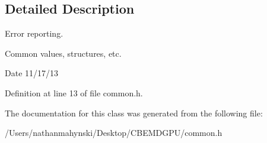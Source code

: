 \subsection{Detailed Description}
Error reporting. 

Common values, structures, etc. \begin{DoxyDate}{Date}
11/17/13 
\end{DoxyDate}


Definition at line 13 of file common.\-h.



The documentation for this class was generated from the following file\-:\begin{DoxyCompactItemize}
\item 
/\-Users/nathanmahynski/\-Desktop/\-C\-B\-E\-M\-D\-G\-P\-U/common.\-h\end{DoxyCompactItemize}
